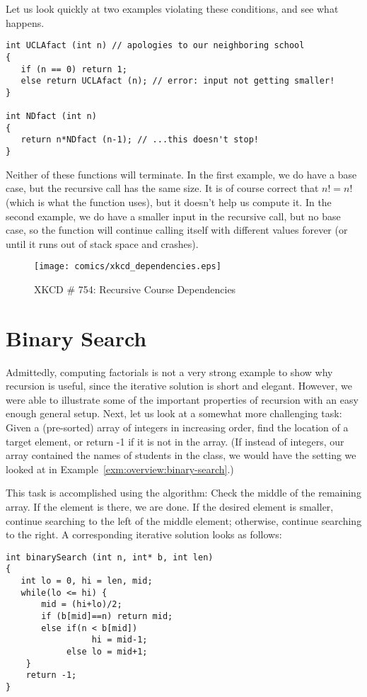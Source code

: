 Let us look quickly at two examples violating these conditions, and
see what happens.

\begin{verbatim}
int UCLAfact (int n) // apologies to our neighboring school
{
   if (n == 0) return 1;
   else return UCLAfact (n); // error: input not getting smaller!
}

int NDfact (int n)
{
   return n*NDfact (n-1); // ...this doesn't stop!
}
\end{verbatim}

Neither of these functions will terminate.
In the first example, we do have a base case, but the recursive call
has the same size.
It is of course correct that $n! = n!$
(which is what the function uses),
but it doesn't help us compute it.
In the second example,
we do have a smaller input in the recursive call,
but no base case, so the function will continue calling itself
with different values forever
(or until it runs out of stack space and crashes).

\begin{figure}[htb]
\centering
\texttt{[image: comics/xkcd\_dependencies.eps]}
\caption{XKCD \# 754: Recursive Course Dependencies}
\end{figure}

\section{Binary Search}
Admittedly, computing factorials is not a very strong example to show
why recursion is useful, since the iterative solution is short and
elegant. However, we were able to illustrate some of the important
properties of recursion with an easy enough general setup.
Next, let us look at a somewhat more challenging task:
Given a (pre-sorted) array of integers in increasing order, find the
location of a target element, or return -1 if it is not in the array.
(If instead of integers, our array contained the names of students in
the class, we would have the setting we looked at in
Example~\ref{exm:overview:binary-search}.)

This task is accomplished using the  algorithm:
Check the middle of the remaining array.
If the element is there, we are done.
If the desired element is smaller,
continue searching to the left of the middle element;
otherwise, continue searching to the right.
A corresponding iterative solution looks as follows:

\begin{verbatim}
int binarySearch (int n, int* b, int len) 
{
   int lo = 0, hi = len, mid;
   while(lo <= hi) {
       mid = (hi+lo)/2;
       if (b[mid]==n) return mid;
       else if(n < b[mid])
                 hi = mid-1;
            else lo = mid+1;
    }
    return -1;
}
\end{verbatim}

